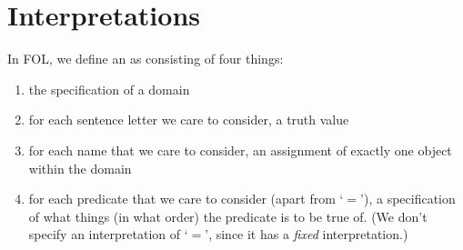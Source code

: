 \documentclass[12pt, a4paper, oneside, openright, titlepage]{book}
\begin{document}
\section{\textsection Interpretations}

\begin{defn}
    In FOL, we define an  as consisting of four things: \begin{enumerate}
        \item the specification of a domain
        \item for each sentence letter we care to consider, a truth value
        \item for each name that we care to consider, an assignment of exactly one object within the domain
        \item for each predicate that we care to consider (apart from `$=$'), a specification of what things (in what order) the predicate is to be true of. (We don't specify an interpretation of `$=$', since it has a \emph{fixed} interpretation.)
    \end{enumerate}
\end{defn}
\end{document}
